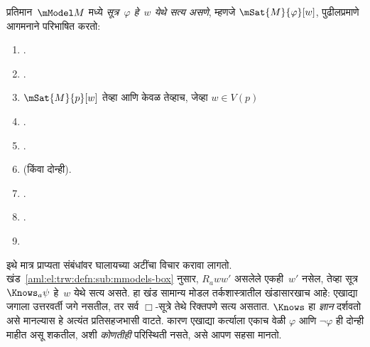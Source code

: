\begin{defn}\label{aml:el:trw:defn:mmodels}
  प्रतिमान~$\mModel M$ मध्ये \emph{सूत्र~$\varphi$ हे~$w$ येथे
  सत्य असणे}, म्हणजे $\mSat{M}{\varphi}[w]$, पुढीलप्रमाणे
  आगमनाने परिभाषित करतो:
  \begin{enumerate}
  \item {}.
  \item {}.
  \item $\mSat{M}{p}[w]$ तेव्हा आणि केवळ तेव्हाच, जेव्हा $w \in V(p)$
  \item {}.
  \item {}.
  \item {} (किंवा दोन्ही).
  \item {}.
  \item {}.
  \item\label{aml:el:trw:defn:sub:mmodels-box}
  \end{enumerate}
\end{defn}

इथे मात्र प्राप्यता संबंधांवर घालायच्या अटींचा विचार
करावा लागतो. खंड~\ref{aml:el:trw:defn:sub:mmodels-box} नुसार,
$R_a ww'$ असलेले एकही~$w'$ नसेल, तेव्हा
सूत्र~$\Knows_a \psi$ हे~$w$ येथे सत्य असते.
हा खंड सामान्य मोडल तर्कशास्त्रातील खंडासारखाच
आहे: एखाद्या जगाला उत्तरवर्ती जगे नसतील, तर सर्व
$\Box$-सूत्रे तेथे रिक्तपणे सत्य असतात. $\Knows$ हा
\emph{ज्ञान} दर्शवतो असे मानल्यास हे अत्यंत
प्रतिसहजभासी वाटते. कारण एखाद्या कर्त्याला एकाच
वेळी $\varphi$ आणि $\lnot \varphi$ ही दोन्ही माहीत असू शकतील,
अशी \emph{कोणतीही} परिस्थिती नसते, असे आपण
सहसा मानतो.

